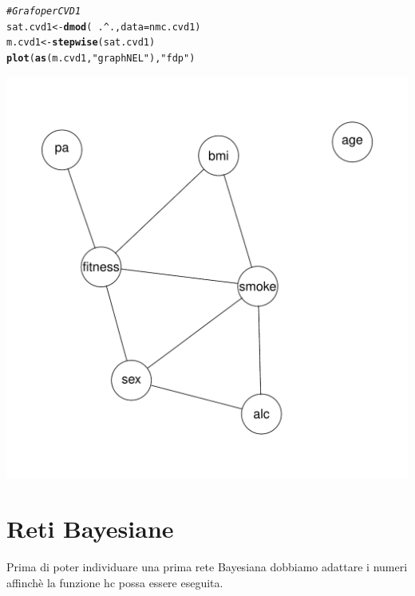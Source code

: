 \documentclass{article}\usepackage[]{graphicx}\usepackage[]{xcolor}
\makeatletter
\def\maxwidth{ %
  \ifdim\Gin@nat@width>\linewidth
    \linewidth
  \else
    \Gin@nat@width
  \fi
}
\newcommand{\hlstr}[1]{\textcolor[rgb]{0.192,0.494,0.8}{#1}}%
\newcommand{\hlcom}[1]{\textcolor[rgb]{0.678,0.584,0.686}{\textit{#1}}}%
\newcommand{\hlopt}[1]{\textcolor[rgb]{0,0,0}{#1}}%
\newcommand{\hlstd}[1]{\textcolor[rgb]{0.345,0.345,0.345}{#1}}%
\newcommand{\hlkwb}[1]{\textcolor[rgb]{0.69,0.353,0.396}{#1}}%
\newcommand{\hlkwc}[1]{\textcolor[rgb]{0.333,0.667,0.333}{#1}}%
\newcommand{\hlkwd}[1]{\textcolor[rgb]{0.737,0.353,0.396}{\textbf{#1}}}%
\newenvironment{kframe}{%
 \def\at@end@of@kframe{}%
 \ifinner\ifhmode%
  \def\at@end@of@kframe{\end{minipage}}%
  \begin{minipage}{\columnwidth}%
 \fi\fi%
 \def\FrameCommand##1{\hskip\@totalleftmargin \hskip-\fboxsep
 \colorbox{shadecolor}{##1}\hskip-\fboxsep
     \hskip-\linewidth \hskip-\@totalleftmargin \hskip\columnwidth}%
 \MakeFramed {\advance\hsize-\width
   \@totalleftmargin\z@ \linewidth\hsize
   \@setminipage}}%
 {\par\unskip\endMakeFramed%
 \at@end@of@kframe}
\newenvironment{knitrout}{}{} %
\makeatother
\begin{document}
    
\begin{knitrout}
\color{fgcolor}\begin{kframe}
\begin{alltt}
\hlcom{#Grafo per CVD1}
\hlstd{sat.cvd1} \hlkwb{<-} \hlkwd{dmod}\hlstd{(}\hlopt{~}\hlstd{.}\hlopt{^}\hlstd{.,} \hlkwc{data}\hlstd{=nmc.cvd1)}
\hlstd{m.cvd1} \hlkwb{<-} \hlkwd{stepwise}\hlstd{(sat.cvd1)}
\hlkwd{plot}\hlstd{(}\hlkwd{as}\hlstd{(m.cvd1,} \hlstr{"graphNEL"}\hlstd{),} \hlstr{"fdp"}\hlstd{)}
\end{alltt}
\end{kframe}
\includegraphics[width=\maxwidth]{figure/Grafo_CVD1-1} 
\end{knitrout}
    
    
\clearpage


  \section{Reti Bayesiane}
    Prima di poter individuare una prima rete Bayesiana dobbiamo adattare i
    numeri affinchè la funzione hc possa essere eseguita.
    
\end{document}
